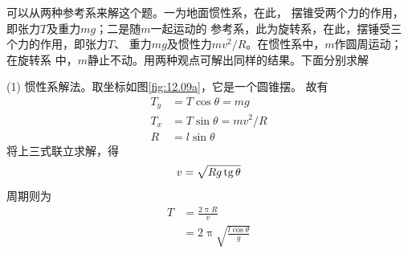 \begin{figurex}
    \centering
    \qquad
    \caption{}
    \label{fig:12.09}
\end{figurex}

\solution 可以从两种参考系来解这个题。一为地面惯性系，在此，
摆锥受两个力的作用，即张力$ T $及重力$ mg $；二是随$ m $一起运动的
参考系，此为旋转系，在此，摆锤受三个力的作用，即张力$ T $、
重力$ mg $及惯性力$ mv^2/R $。在惯性系中，$ m $作圆周运动；在旋转系
中，$ m $静止不动。用两种观点可解出同样的结果。下面分别求解

(1) 惯性系解法。取坐标如图\ref{fig:12.09a}，它是一个圆锥摆。
故有
\begin{align*}
    T _ { y } &= T \cos \theta = m g \\
    T _ { x } &= T \sin \theta = m v ^ { 2 } / R \\
    R &= l \sin \theta
\end{align*}
将上三式联立求解，得
\begin{equation*}
    v = \sqrt { R g \operatorname{tg} \theta }
\end{equation*}
周期则为
\begin{align*}
    T &= \frac { 2 \uppi R } { v } \\
      &= 2 \uppi \sqrt{ \frac { l \cos \theta } { g }}
\end{align*}

